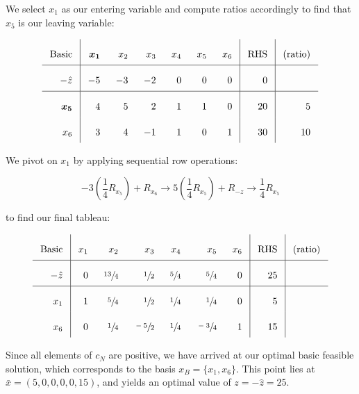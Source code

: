 \begin{solution}
  We select $x_1$ as our entering variable and compute ratios accordingly to find that $x_5$ is our leaving variable:


  \[\arraycolsep=8pt\def\arraystretch{2.2}
  \begin{array}{r|rrrrrr|r|r}
    \text{Basic} &  \bm{x_1}  &  x_2  &  x_3  &  x_4  & x_5 & x_6  & \text{RHS} & \text{(ratio)}  \\ \hline
    -\hat{z}     &  -5        &  -3   &  -2   &   0   &  0  &  0   &   0        &                 \\ \hline
    \bm{x_5}     &   4        &   5   &   2   &   1   &  1  &  0   &  20        & 5               \\
    x_6          &   3        &   4   &  -1   &   1   &  0  &  1   &  30        & 10              
  \end{array}
  \]

  \pagebreak
  We pivot on $x_1$ by applying sequential row operations:

  $$
  -3 \left(\frac{1}{4} R_{x_5}\right) + R_{x_6} \longrightarrow 
  5 \left(\frac{1}{4} R_{x_5}\right) + R_{-z} \longrightarrow 
  \frac{1}{4} R_{x_5}
  $$

  to find our final tableau:

  \[\arraycolsep=8pt\def\arraystretch{2.2}
  \begin{array}{r|rrrrrr|r|r}
    \text{Basic} &  x_1  &  x_2            &  x_3           &  x_4           &  x_5           & x_6  & \text{RHS} & \text{(ratio)}  \\ \hline
    -\hat{z}     &   0   &  \sfrac{13}{4}  &  \sfrac{1}{2}  &  \sfrac{5}{4}  &  \sfrac{5}{4}  &  0   &  25        &                 \\ \hline
    x_1          &   1   &  \sfrac{5}{4}   &  \sfrac{1}{2}  &  \sfrac{1}{4}  &  \sfrac{1}{4}  &  0   &   5        &                 \\
    x_6          &   0   &  \sfrac{1}{4}   &  \sfrac{-5}{2} &  \sfrac{1}{4}  &  \sfrac{-3}{4} &  1   &  15        &              
  \end{array}
  \]

  Since all elements of $c_N$ are positive, we have arrived at our optimal basic feasible solution, which corresponds to
  the basis $x_B = \{x_1, x_6\}$. This point lies at \linebreak
  $\bar{x} = \left(5, 0, 0, 0, 0, 15\right)$, and yields an optimal value of $z = -\hat{z} = 25$.
  \ \\
\end{solution}
